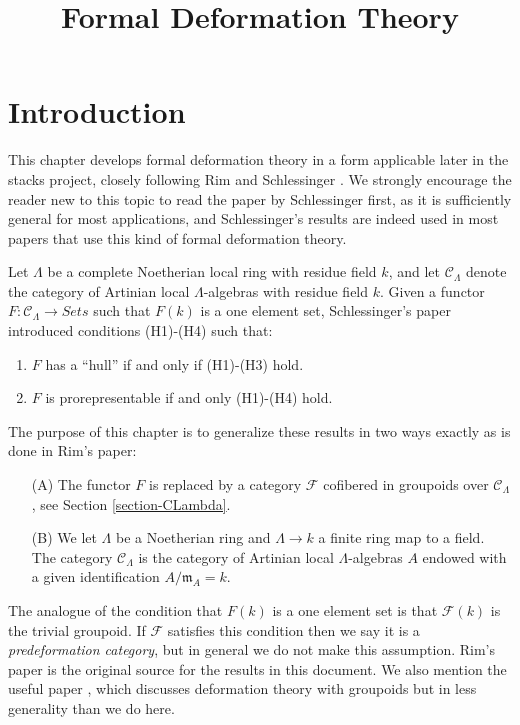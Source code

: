 


%


\title{Formal Deformation Theory}


\maketitle

\label{section-phantom}

\tableofcontents



\section{Introduction}
\label{section-introduction}

\noindent
This chapter develops formal deformation theory in a form applicable
later in the stacks project, closely following Rim \cite[Exposee VI]{SGA7-I}
and Schlessinger \cite{Sch}. We strongly encourage the reader new to
this topic to read the paper by Schlessinger first, as it is sufficiently
general for most applications, and Schlessinger's results are indeed
used in most papers that use this kind of formal deformation theory.

\medskip\noindent
Let $\Lambda$ be a complete Noetherian local ring with residue field $k$,
and let $\mathcal{C}_\Lambda$ denote the category of Artinian local
$\Lambda$-algebras with residue field $k$. Given a functor
$F : \mathcal{C}_\Lambda \to \textit{Sets}$ such that $F(k)$
is a one element set, Schlessinger's paper introduced conditions
(H1)-(H4) such that:
\begin{enumerate}
\item $F$ has a ``hull'' if and only if (H1)-(H3) hold.
\item $F$ is prorepresentable if and only (H1)-(H4) hold.
\end{enumerate}
The purpose of this chapter is to generalize these results in two ways
exactly as is done in Rim's paper:
\begin{enumerate}
\item[(A)] The functor $F$ is replaced by a category $\mathcal{F}$ cofibered
in groupoids over $\mathcal{C}_\Lambda$, see
Section \ref{section-CLambda}.
\item[(B)] We let $\Lambda$ be a Noetherian ring and $\Lambda \to k$
a finite ring map to a field. The category $\mathcal{C}_\Lambda$ is
the category of Artinian local $\Lambda$-algebras $A$ endowed with a
given identification $A/\mathfrak m_A = k$.
\end{enumerate}
The analogue of the condition that $F(k)$ is a  one element set is that
$\mathcal{F}(k)$ is the trivial groupoid. If $\mathcal{F}$ satisfies this
condition then we say it is a {\it predeformation category}, but in  general
we do not make this assumption.  Rim's paper \cite[Exposee VI]{SGA7-I} is the
original source for the results in this document. We also mention the useful
paper \cite{Vistoli}, which discusses deformation theory with groupoids but
in less generality than we do here.


